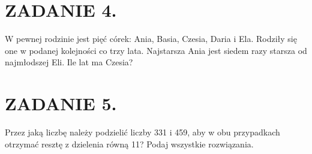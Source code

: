 \documentclass[10pt]{article}
\begin{document}
\section*{ZADANIE 4.}
W pewnej rodzinie jest pięć córek: Ania, Basia, Czesia, Daria i Ela. Rodziły się one w podanej kolejności co trzy lata. Najstarsza Ania jest siedem razy starsza od najmłodszej Eli. Ile lat ma Czesia?

\section*{ZADANIE 5.}
Przez jaką liczbę należy podzielić liczby 331 i 459, aby w obu przypadkach otrzymać resztę z dzielenia równą 11? Podaj wszystkie rozwiązania.
\end{document}
